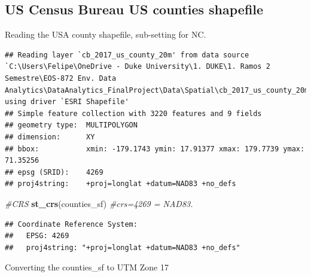 \documentclass[12pt,]{article}
\newenvironment{Shaded}{\begin{snugshade}}{\end{snugshade}}
\newcommand{\KeywordTok}[1]{\textcolor[rgb]{0.13,0.29,0.53}{\textbf{#1}}}
\newcommand{\DataTypeTok}[1]{\textcolor[rgb]{0.13,0.29,0.53}{#1}}
\newcommand{\DecValTok}[1]{\textcolor[rgb]{0.00,0.00,0.81}{#1}}
\newcommand{\StringTok}[1]{\textcolor[rgb]{0.31,0.60,0.02}{#1}}
\newcommand{\CommentTok}[1]{\textcolor[rgb]{0.56,0.35,0.01}{\textit{#1}}}
\newcommand{\OperatorTok}[1]{\textcolor[rgb]{0.81,0.36,0.00}{\textbf{#1}}}
\newcommand{\NormalTok}[1]{#1}
\begin{document}
\newpage

\subsection{US Census Bureau US counties
shapefile}\label{us-census-bureau-us-counties-shapefile-1}

Reading the USA county shapefile, sub-setting for NC.

\begin{Shaded}
\end{Shaded}

\begin{verbatim}
## Reading layer `cb_2017_us_county_20m' from data source `C:\Users\Felipe\OneDrive - Duke University\1. DUKE\1. Ramos 2 Semestre\EOS-872 Env. Data Analytics\DataAnalytics_FinalProject\Data\Spatial\cb_2017_us_county_20m.shp' using driver `ESRI Shapefile'
## Simple feature collection with 3220 features and 9 fields
## geometry type:  MULTIPOLYGON
## dimension:      XY
## bbox:           xmin: -179.1743 ymin: 17.91377 xmax: 179.7739 ymax: 71.35256
## epsg (SRID):    4269
## proj4string:    +proj=longlat +datum=NAD83 +no_defs
\end{verbatim}

\begin{Shaded}
\begin{Highlighting}[]
\CommentTok{#CRS}
\KeywordTok{st_crs}\NormalTok{(counties_sf) }\CommentTok{#crs=4269 = NAD83.}
\end{Highlighting}
\end{Shaded}

\begin{verbatim}
## Coordinate Reference System:
##   EPSG: 4269 
##   proj4string: "+proj=longlat +datum=NAD83 +no_defs"
\end{verbatim}

Converting the counties\_sf to UTM Zone 17

\begin{Shaded}
\end{Shaded}
\end{document}
